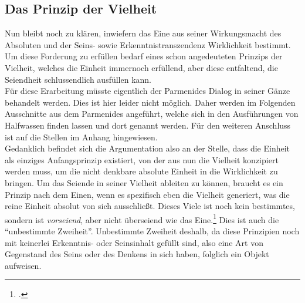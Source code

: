 \subsection{Das Prinzip der Vielheit}
Nun bleibt noch zu klären, inwiefern das Eine aus seiner Wirkungsmacht des Absoluten und der Seins- sowie Erkenntnistranszendenz Wirklichkeit bestimmt. Um diese Forderung zu erfüllen bedarf eines schon angedeuteten Prinzips der Vielheit, welches die Einheit immernoch erfüllend, aber diese entfaltend, die Seiendheit schlussendlich ausfüllen kann.\\
Für diese Erarbeitung müsste eigentlich der Parmenides Dialog in seiner Gänze behandelt werden. Dies ist hier leider nicht möglich. Daher werden im Folgenden Ausschnitte aus dem Parmenides angeführt, welche sich in den Ausführungen von Halfwassen finden lassen und dort genannt werden. Für den weiteren Anschluss ist auf die Stellen im Anhang hingewiesen.\\ 
Gedanklich befindet sich die Argumentation also an der Stelle, dass die Einheit als einziges Anfangsprinzip existiert, von der aus nun die Vielheit konzipiert werden muss, um die nicht denkbare absolute Einheit in die Wirklichkeit zu bringen. Um das Seiende in seiner Vielheit ableiten zu können, braucht es ein Prinzip nach dem Einen, wenn es spezifisch eben die Vielheit generiert, was die reine Einheit absolut von sich ausschließt. Dieses Viele ist noch kein bestimmtes, sondern ist \emph{vorseiend}, aber nicht überseiend wie das Eine.\footcite[vgl.][S. 103]{halfwassen2015spuren} Dies ist auch die \enquote{unbestimmte Zweiheit}. Unbestimmte Zweiheit deshalb, da diese Prinzipien noch mit keinerlei Erkenntnis- oder Seinsinhalt gefüllt sind, also eine Art von Gegenstand des Seins oder des Denkens in sich haben, folglich ein Objekt aufweisen.

